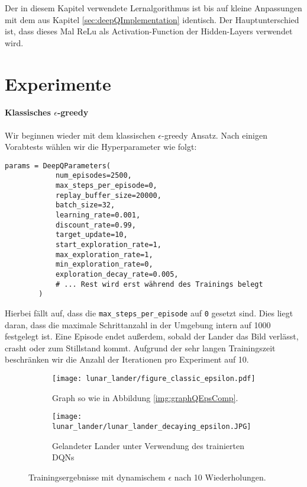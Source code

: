 Der in diesem Kapitel verwendete Lernalgorithmus ist bis auf kleine Anpassungen mit dem aus Kapitel \ref{sec:deepQImplementation} identisch. Der Hauptunterschied ist, dass dieses Mal ReLu als Activation-Function der Hidden-Layers verwendet wird.

\section{Experimente}
\paragraph{Klassisches $ \epsilon $-greedy}
Wir beginnen wieder mit dem klassischen $ \epsilon $-greedy Ansatz. Nach einigen Vorabtests wählen wir die Hyperparameter wie folgt:
\begin{verbatim}
params = DeepQParameters(
            num_episodes=2500,
            max_steps_per_episode=0,
            replay_buffer_size=20000,
            batch_size=32,
            learning_rate=0.001,
            discount_rate=0.99,
            target_update=10,
            start_exploration_rate=1,
            max_exploration_rate=1,
            min_exploration_rate=0,
            exploration_decay_rate=0.005,
            # ... Rest wird erst während des Trainings belegt
        )
\end{verbatim}
Hierbei fällt auf, dass die \texttt{max_steps_per_episode} auf \texttt{0} gesetzt sind. Dies liegt daran, dass die maximale Schrittanzahl in der Umgebung intern auf 1000 festgelegt ist. Eine Episode endet außerdem, sobald der Lander das Bild verlässt, crasht oder zum Stillstand kommt. Aufgrund der sehr langen Trainingszeit beschränken wir die Anzahl der Iterationen pro Experiment auf 10.

\begin{figure}[h!]
    \centering
    \begin{subfigure}[b]{0.7\textwidth}
        \texttt{[image: lunar\_lander/figure\_classic\_epsilon.pdf]}
        \caption{Graph so wie in Abbildung \ref{img:graphQEpsComp}.}
        \label{img:lunarClassicEps01Graph}
    \end{subfigure}
    \begin{subfigure}[b]{0.5\textwidth}
        \texttt{[image: lunar\_lander/lunar\_lander\_decaying\_epsilon.JPG]}
        \caption{Gelandeter Lander unter Verwendung des trainierten DQNs}
        \label{img:lunarClassicEps01Env}
    \end{subfigure}
    \caption{Trainingsergebnisse mit dynamischem $ \epsilon $ nach 10 Wiederholungen.} \label{img:lunarClassicEps01}
\end{figure}

